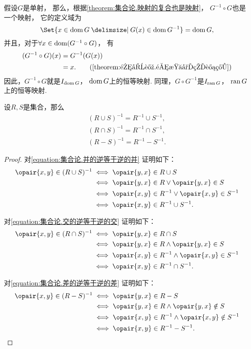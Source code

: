 \begin{example}
假设\(G\)是单射，
那么，根据\cref{theorem:集合论.映射的复合也是映射}，
\(G^{-1} \circ G\)也是一个映射，
它的定义域为\[
	\Set{ x \in \dom G \given G(x) \in \dom G^{-1} }
	= \dom G,
\]
并且，对于\(\forall x \in \operatorname{dom}(G^{-1} \circ G)\)，
有\begin{align*}
	(G^{-1} \circ G)(x) &= G^{-1}(G(x)) \\
	&= x. \tag{\cref{theorem:集合论.逆映射的计算}}
\end{align*}
因此，\(G^{-1} \circ G\)就是\(I_{\operatorname{dom} G}\)，
\(\operatorname{dom} G\)上的恒等映射.
同理，\(G \circ G^{-1}\)是\(I_{\operatorname{ran} G}\)，
\(\operatorname{ran} G\)上的恒等映射.
\end{example}

\begin{theorem}
设\(R,S\)是集合，那么\begin{gather}
	(R \cup S)^{-1} = R^{-1} \cup S^{-1},
	\label{equation:集合论.并的逆等于逆的并} \\
	(R \cap S)^{-1} = R^{-1} \cap S^{-1},
	\label{equation:集合论.交的逆等于逆的交} \\
	(R - S)^{-1} = R^{-1} - S^{-1}.
	\label{equation:集合论.差的逆等于逆的差}
\end{gather}
\begin{proof}
对\cref{equation:集合论.并的逆等于逆的并} 证明如下：
\begin{align*}
	\opair{x,y} \in (R \cup S)^{-1}
	&\iff \opair{y,x} \in R \cup S \\
	&\iff \opair{y,x} \in R \lor \opair{y,x} \in S \\
	&\iff \opair{x,y} \in R^{-1} \lor \opair{x,y} \in S^{-1} \\
	&\iff \opair{x,y} \in R^{-1} \cup S^{-1}.
\end{align*}

对\cref{equation:集合论.交的逆等于逆的交} 证明如下：
\begin{align*}
	\opair{x,y} \in (R \cap S)^{-1}
	&\iff \opair{y,x} \in R \cap S \\
	&\iff \opair{y,x} \in R \land \opair{y,x} \in S \\
	&\iff \opair{x,y} \in R^{-1} \land \opair{x,y} \in S^{-1} \\
	&\iff \opair{x,y} \in R^{-1} \cap S^{-1}.
\end{align*}

对\cref{equation:集合论.差的逆等于逆的差} 证明如下：
\begin{align*}
	\opair{x,y} \in (R - S)^{-1}
	&\iff \opair{y,x} \in R - S \\
	&\iff \opair{y,x} \in R \land \opair{y,x} \notin S \\
	&\iff \opair{x,y} \in R^{-1} \land \opair{x,y} \notin S^{-1} \\
	&\iff \opair{x,y} \in R^{-1} - S^{-1}.
	\qedhere
\end{align*}
\end{proof}
\end{theorem}

